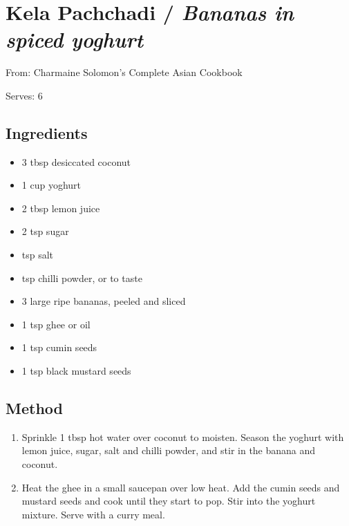 \clearpage
\section{Kela Pachchadi / \emph{Bananas in spiced yoghurt}}


From: Charmaine Solomon's Complete Asian Cookbook

Serves: 6

\subsection{Ingredients}

\begin{itemize}
	\item 3 tbsp desiccated coconut 
	\item 1 cup yoghurt 
	\item 2 tbsp lemon juice 
	\item 2 tsp sugar 
	\item {} tsp salt 
	\item {} tsp chilli powder, or to taste 
	\item 3 large ripe bananas, peeled and sliced 
	\item 1 tsp ghee or oil 
	\item 1 tsp cumin seeds 
	\item 1 tsp black mustard seeds
\end{itemize}

\subsection{Method}

\begin{enumerate}
	\item Sprinkle 1 tbsp hot water over coconut to moisten. Season the yoghurt with lemon juice, sugar, salt and chilli powder, and stir in the banana and coconut. 
	\item Heat the ghee in a small saucepan over low heat. Add the cumin seeds and mustard seeds and cook until they start to pop. Stir into the yoghurt mixture. Serve with a curry meal. 
\end{enumerate}
